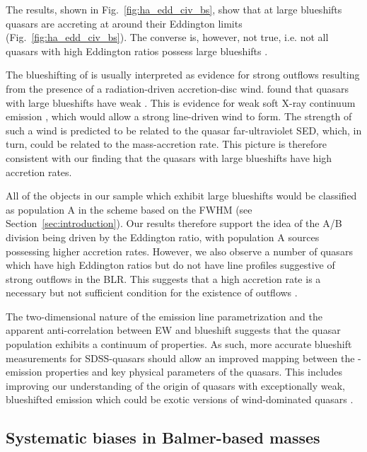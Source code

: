 The results, shown in Fig.~\ref{fig:ha_edd_civ_bs}, show that at large blueshifts quasars are accreting at around their Eddington limits (Fig.~\ref{fig:ha_edd_civ_bs}). 
The converse is, however, not true, i.e. not all quasars with high Eddington ratios possess large  blueshifts \citep[see][]{baskin05}.

The blueshifting of  is usually interpreted as evidence for strong outflows resulting from the presence of a radiation-driven accretion-disc wind. 
\citet{richards02} found that quasars with large  blueshifts have weak .
This is evidence for weak soft X-ray continuum emission \citep{leighly04}, which would allow a strong line-driven wind to form.  
The strength of such a wind is predicted to be related to the quasar far-ultraviolet SED, which, in turn, could be related to the mass-accretion rate.
This picture is therefore consistent with our finding that the quasars with large  blueshifts have high accretion rates. 

All of the objects in our sample which exhibit large  blueshifts would be classified as population A in the \citet{sulentic00b} scheme based on the \ha FWHM (see Section~\ref{sec:introduction}). 
Our results therefore support the idea of the \citet{sulentic00b} A/B division being driven by the Eddington ratio, with population A sources possessing higher accretion rates.
However, we also observe a number of quasars which have high Eddington ratios but do not have line profiles suggestive of strong outflows in the  BLR.  
This suggests that a high accretion rate is a necessary but not sufficient condition for the existence of outflows \citep{baskin05}. 

The two-dimensional nature of the  emission line parametrization and the apparent anti-correlation between  EW and  blueshift suggests that the quasar population exhibits a continuum of properties. 
As such, more accurate  blueshift measurements for SDSS-quasars should allow an improved mapping between the -emission properties and key physical parameters of the quasars.
This includes improving our understanding of the origin of quasars with exceptionally weak, blueshifted  emission \citep[weak emission line quasars;][]{luo15} which could be exotic versions of wind-dominated quasars \citep{plotkin15}.

\subsection{Systematic biases in Balmer-based masses}

